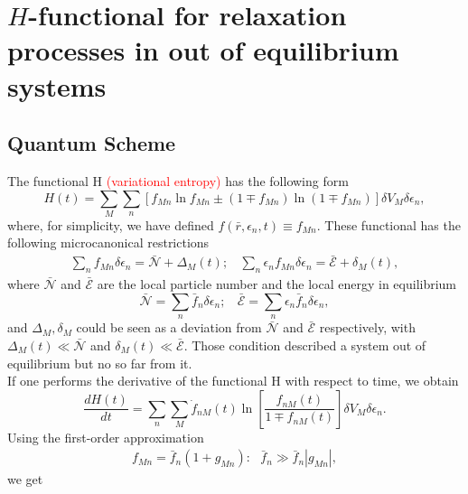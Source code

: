 \documentclass{article}
\begin{document}
\section{$H$-functional for relaxation processes in out of equilibrium systems}


\subsection{Quantum Scheme}

The functional H \textcolor{red}{(variational entropy)} has the following form
\begin{equation}
    H(t)=\sum_{M} \sum_{n} \left[ f_{Mn} \ln f_{Mn} \pm (1 \mp f_{Mn}) \ln (1 \mp f_{Mn}) \right]\delta V_M \delta \epsilon_n \label{entropy2},
\end{equation}
where, for simplicity, we have defined $f(\bar{r},\epsilon_{n},t)\equiv f_{Mn}$.
These functional has the following microcanonical restrictions
\begin{eqnarray}
        \sum_{n}f_{Mn} \delta \epsilon_n=\bar{\mathcal{N}}+\Delta_M(t); \ \ \ \ \sum_{n}\epsilon_{n}f_{Mn} \delta \epsilon_n=\bar{\mathcal{E}}+ \delta_M(t), \label{restrictionoutside}
  \end{eqnarray}
  where $\bar {\mathcal{N}}$ and $\bar{\mathcal{E}}$ are the local particle number and the local energy in equilibrium
  \begin{equation}
      \bar{\mathcal{N}}= \sum_n \bar{f}_n \delta \epsilon_n; \ \ \ \ \bar{\mathcal{E}}= \sum_n \epsilon_n\bar{f}_n \delta \epsilon_n,
  \end{equation}
  and $\Delta_M,\delta_M$ could be seen as a deviation from $\bar{\mathcal{N}}$ and $\bar{\mathcal{E}}$ respectively, with $\Delta_M(t)\ll \bar{\mathcal{N}}$ and $\delta_M(t) \ll \bar{\mathcal{E}}$. Those condition described a system out of equilibrium but no so far from it.  \\
If one performs the derivative of the functional H with respect to time, we obtain
\begin{equation}
   \frac{dH(t)}{dt}= \sum_n \sum_M \dot{f}_{nM}(t)\ln \left[ \frac{f_{nM}(t)}{1\mp f_{nM}(t)} \right]\delta V_M \delta \epsilon_n.\label{deltaH}
\end{equation}{}
Using the first-order approximation
\begin{eqnarray}
   f_{Mn}=\bar{f}_{n}(1+g_{Mn}): \ \ \ \bar{f}_{n}\gg \bar{f}_{n}|g_{Mn}|, \label{firstorder}
\end{eqnarray}{}
we get 
\end{document}
